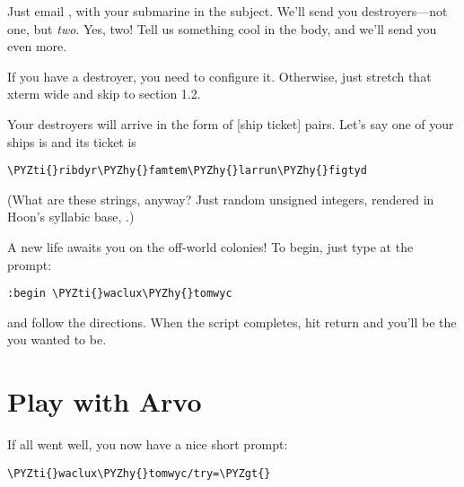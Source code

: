 Just email , with your submarine in the subject.
We'll send you destroyers---not one, but \emph{two}.  Yes, two!  Tell
us something cool in the body, and we'll send you even more.

If you have a destroyer, you need to configure it.  Otherwise,
just stretch that xterm wide and skip to section 1.2.

Your destroyers will arrive in the form of [ship ticket] pairs.
Let's say one of your ships is  and its ticket is

\begin{framed_shaded}
\begin{Verbatim}[fontsize=\relsize{-2.5},fontseries=b,commandchars=\\\{\}]
\PYZti{}ribdyr\PYZhy{}famtem\PYZhy{}larrun\PYZhy{}figtyd
\end{Verbatim}
\end{framed_shaded}

(What are these strings, anyway?  Just random unsigned integers,
rendered in Hoon's syllabic base, .)

A new life awaits you on the off-world colonies!  To begin, just
type at the prompt:

\begin{framed_shaded}
\begin{Verbatim}[fontsize=\relsize{-2.5},fontseries=b,commandchars=\\\{\}]
:begin \PYZti{}waclux\PYZhy{}tomwyc
\end{Verbatim}
\end{framed_shaded}

and follow the directions.  When the script completes, hit return
and you'll be the  you wanted to be.

\section{Play with Arvo}

If all went well, you now have a nice short prompt:

\begin{framed_shaded}
\begin{Verbatim}[fontsize=\relsize{-2.5},fontseries=b,commandchars=\\\{\}]
\PYZti{}waclux\PYZhy{}tomwyc/try=\PYZgt{}
\end{Verbatim}
\end{framed_shaded}

